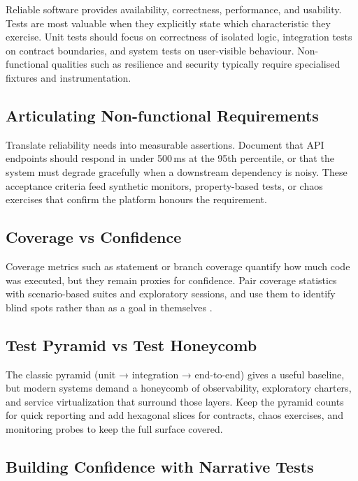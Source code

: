 Reliable software provides availability, correctness, performance, and usability. Tests are most valuable when they explicitly state which characteristic they exercise. Unit tests should focus on correctness of isolated logic, integration tests on contract boundaries, and system tests on user-visible behaviour. Non-functional qualities such as resilience and security typically require specialised fixtures and instrumentation.

\subsection{Articulating Non-functional Requirements}

Translate reliability needs into measurable assertions. Document that API endpoints should respond in under 500\,ms at the 95th percentile, or that the system must degrade gracefully when a downstream dependency is noisy. These acceptance criteria feed synthetic monitors, property-based tests, or chaos exercises that confirm the platform honours the requirement.

\subsection{Coverage vs Confidence}

Coverage metrics such as statement or branch coverage quantify how much code was executed, but they remain proxies for confidence. Pair coverage statistics with scenario-based suites and exploratory sessions, and use them to identify blind spots rather than as a goal in themselves \citep{myers2011art}.

\subsection{Test Pyramid vs Test Honeycomb}

The classic pyramid (unit → integration → end-to-end) gives a useful baseline, but modern systems demand a honeycomb of observability, exploratory charters, and service virtualization that surround those layers. Keep the pyramid counts for quick reporting and add hexagonal slices for contracts, chaos exercises, and monitoring probes to keep the full surface covered.

\subsection{Building Confidence with Narrative Tests}

